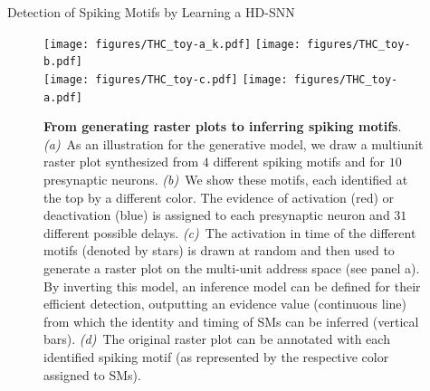 \documentclass[final]{beamer}
\newlength{\colwidth}
\begin{document}
\begin{frame}[t]
\begin{columns}[t]
\begin{column}{\colwidth}
  \begin{exampleblock}{Detection of Spiking Motifs by Learning a HD-SNN~\textcite{Perrinet23ICANN}}

%
%
%
%
%
%
%
\begin{figure}%
  \texttt{[image: figures/THC\_toy-a\_k.pdf]}
  \texttt{[image: figures/THC\_toy-b.pdf]}
  \\
  \texttt{[image: figures/THC\_toy-c.pdf]}
  \texttt{[image: figures/THC\_toy-a.pdf]} 
\caption{\textbf{From generating raster plots to inferring spiking motifs}. \textit{(a)}~As an illustration for the generative model, we draw a multiunit raster plot synthesized from $4$ different spiking motifs and for $10$ presynaptic neurons. \textit{(b)}~We show these motifs, each identified at the top by a different color. The evidence of activation (red) or deactivation (blue) is assigned to each presynaptic neuron and $31$ different possible delays. \textit{(c)}~The activation in time of the different motifs (denoted by stars) is drawn at random and then used to generate a raster plot on the multi-unit address space (see panel a). By inverting this model, an inference model can be defined for their efficient detection, outputting an evidence value (continuous line) from which the identity and timing of SMs can be inferred (vertical bars). \textit{(d)}~The original raster plot can be annotated with each identified spiking motif (as represented by the respective color assigned to SMs).
}
\label{fig:THC}
\end{figure}
  \end{exampleblock}


\end{column}
\end{columns}
\end{frame}
\end{document}
